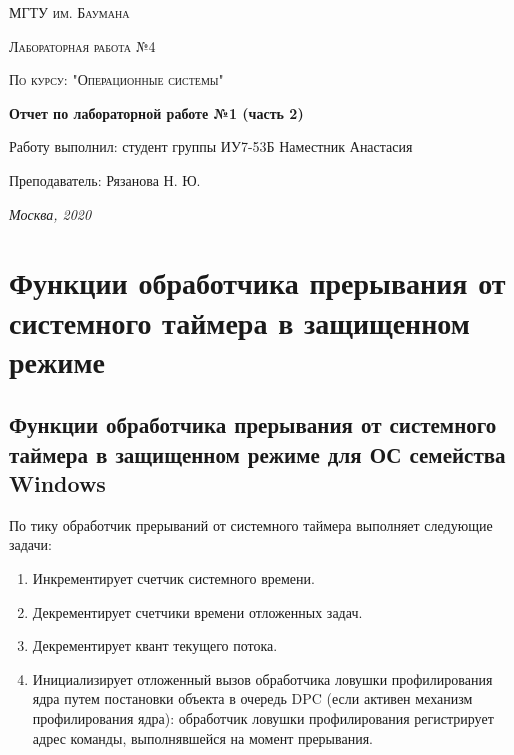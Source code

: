 \documentclass[12pt]{report}
\begin{document}
 
\begin{titlepage}
	\centering
	{\scshape\LARGE МГТУ им. Баумана \par}
	\vspace{3cm}
	{\scshape\Large Лабораторная работа №4\par}
	\vspace{0.5cm}	
	{\scshape\Large По курсу: "Операционные системы"\par}
	\vspace{1.5cm}
	{\huge\bfseries Отчет по лабораторной работе №1 (часть 2)\par}
	\vspace{2cm}
	\Large Работу выполнил: студент группы ИУ7-53Б Наместник Анастасия\par
	\vspace{0.5cm}
	\Large Преподаватель:  Рязанова Н. Ю.\par

	\vfill
	\large \textit {Москва, 2020} \par
\end{titlepage}

\tableofcontents

\newpage

\chapter{Функции обработчика прерывания от системного таймера в защищенном режиме}

\section{Функции обработчика прерывания от системного таймера в защищенном режиме для ОС семейства Windows}

По тику обработчик прерываний от системного таймера выполняет следующие задачи:
\begin{enumerate}
\item Инкрементирует счетчик системного времени.
\item Декрементирует счетчики времени отложенных задач.
\item Декрементирует квант текущего потока.
\item Инициализирует отложенный вызов обработчика ловушки профилирования ядра путем постановки объекта в очередь DPC (если активен механизм профилирования ядра): обработчик ловушки профилирования регистрирует адрес команды, выполнявшейся на момент прерывания.
\end{enumerate}
\end{document}
